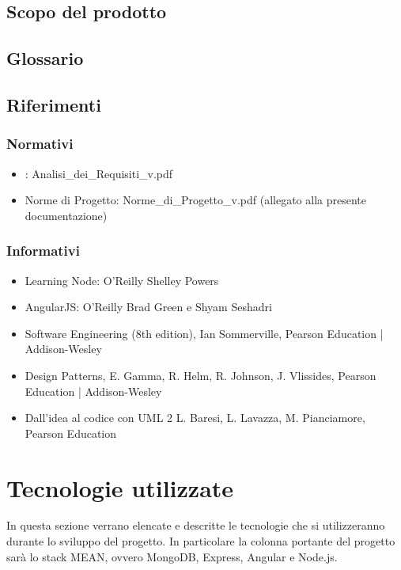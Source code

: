 \subsection{Scopo del prodotto}
\label{1.2}
\Prodotto{}

\subsection{Glossario}%
\label{1.3}
\Glossario{}

\subsection{Riferimenti}
\label{1.4}

\subsubsection{Normativi}
\label{1.4.1}
\begin{itemize}
\item {}: Analisi\_{}dei\_{}Requisiti\_{}v\versioneNormeDiProgetto{}.pdf
\item Norme di Progetto: Norme\_{}di\_{}Progetto\_{}v\versioneNormeDiProgetto{}.pdf  (allegato alla presente documentazione)\\
\end{itemize}

\subsubsection{Informativi}
\label{1.4.2}
\begin{itemize}
\item Learning Node: O'Reilly Shelley Powers
\item AngularJS: O'Reilly Brad Green e Shyam Seshadri
\item Software Engineering (8th edition), Ian Sommerville, Pearson Education | Addison-Wesley
\item Design Patterns, E. Gamma, R. Helm, R. Johnson, J. Vlissides, Pearson Education | Addison-Wesley
\item Dall'idea al codice con UML 2       L. Baresi, L. Lavazza, M. Pianciamore, Pearson Education
\end{itemize}

\newpage
\section{Tecnologie utilizzate}
In questa sezione verrano elencate e descritte le tecnologie che si utilizzeranno durante lo sviluppo del progetto. In particolare la colonna portante del progetto sar\`{a} lo stack MEAN, ovvero MongoDB, Express, Angular e Node.js.

